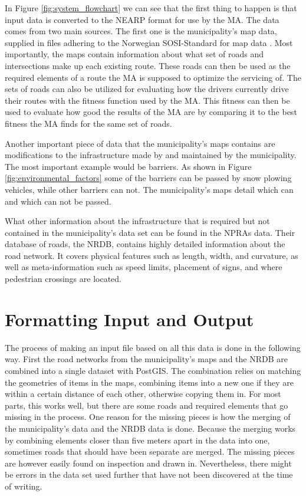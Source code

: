 In Figure \ref{fig:system_flowchart} we can see that the first thing to happen is that input data is converted to the NEARP format \citep{NEARPdocumentationSINTEF} for use by the MA. The data comes from two main sources. The first one is the municipality's map data, supplied in files adhering to the Norwegian SOSI-Standard for map data \citep{kartverketSOSI}. Most importantly, the maps contain information about what set of roads and intersections make up each existing route. These roads can then be used as the required elements of a route the MA is supposed to optimize the servicing of. The sets of roads can also be utilized for evaluating how the drivers currently drive their routes with the fitness function used by the MA. This fitness can then be used to evaluate how good the results of the MA are by comparing it to the best fitness the MA finds for the same set of roads.

Another important piece of data that the municipality's maps contains are modifications to the infrastructure made by and maintained by the municipality. The most important example would be barriers. As shown in Figure \ref{fig:environmental_factors} some of the barriers can be passed by snow plowing vehicles, while other barriers can not. The municipality's maps detail which can and which can not be passed.

What other information about the infrastructure that is required but not contained in the municipality's data set can be found in the NPRAs data. Their database of roads, the NRDB, contains highly detailed information about the road network. It covers physical features such as length, width, and curvature, as well as meta-information such as speed limits, placement of signs, and where pedestrian crossings are located.

\section{Formatting Input and Output} %
\label{sec:achitecture_formatting_input_and_output}

The process of making an input file based on all this data is done in the following way. First the road networks from the municipality's maps and the NRDB are combined into a single dataset with PostGIS. The combination relies on matching the geometries of items in the maps, combining items into a new one if they are within a certain distance of each other, otherwise copying them in. For most parts, this works well, but there are some roads and required elements that go missing in the process. One reason for the missing pieces is how the merging of the municipality's data and the NRDB data is done. Because the merging works by combining elements closer than five meters apart in the data into one, sometimes roads that should have been separate are merged. The missing pieces are however easily found on inspection and drawn in. Nevertheless, there might be errors in the data set used further that have not been discovered at the time of writing.


